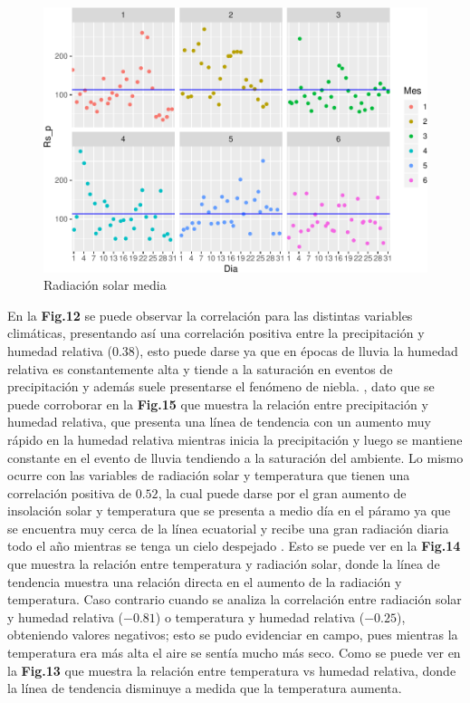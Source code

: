 \documentclass[conference,final,]{IEEEtran}
\makeatletter
\def\maxwidth{\ifdim\Gin@nat@width>\linewidth\linewidth
\else\Gin@nat@width\fi}
\let\Oldincludegraphics\includegraphics
\renewcommand{\includegraphics}[1]{\Oldincludegraphics[width=\maxwidth]{#1}}
\makeatother
\begin{document}
\begin{figure}
\centering
\includegraphics{Hidrology_files/figure-latex/unnamed-chunk-14-1.pdf}
\caption{Radiación solar media}
\end{figure}

En la \textbf{Fig.12} se puede observar la correlación para las
distintas variables climáticas, presentando así una correlación positiva
entre la precipitación y humedad relativa (\(0.38\)), esto puede darse
ya que en épocas de lluvia la humedad relativa es constantemente alta y
tiende a la saturación en eventos de precipitación y además suele
presentarse el fenómeno de niebla. \cite{morales2019atlas}, dato que se
puede corroborar en la \textbf{Fig.15} que muestra la relación entre
precipitación y humedad relativa, que presenta una línea de tendencia
con un aumento muy rápido en la humedad relativa mientras inicia la
precipitación y luego se mantiene constante en el evento de lluvia
tendiendo a la saturación del ambiente. Lo mismo ocurre con las
variables de radiación solar y temperatura que tienen una correlación
positiva de \(0.52\), la cual puede darse por el gran aumento de
insolación solar y temperatura que se presenta a medio día en el páramo
ya que se encuentra muy cerca de la línea ecuatorial y recibe una gran
radiación diaria todo el año mientras se tenga un cielo despejado
\cite{buytaert2006hidrologia}. Esto se puede ver en la \textbf{Fig.14}
que muestra la relación entre temperatura y radiación solar, donde la
línea de tendencia muestra una relación directa en el aumento de la
radiación y temperatura. Caso contrario cuando se analiza la correlación
entre radiación solar y humedad relativa (\(-0.81\)) o temperatura y
humedad relativa (\(-0.25\)), obteniendo valores negativos; esto se pudo
evidenciar en campo, pues mientras la temperatura era más alta el aire
se sentía mucho más seco. Como se puede ver en la \textbf{Fig.13} que
muestra la relación entre temperatura vs humedad relativa, donde la
línea de tendencia disminuye a medida que la temperatura aumenta.
\end{document}
